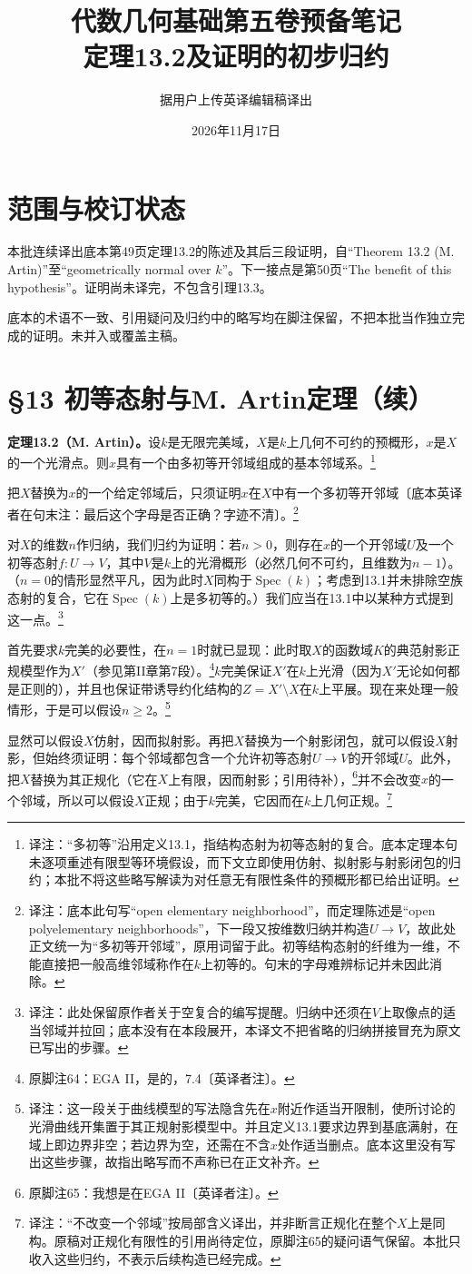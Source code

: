 \documentclass[openany,fontset=fandol]{ctexbook}
\newcommand{\note}[1]{\footnote{译注：#1}}
\begin{document}
\title{代数几何基础第五卷预备笔记\\定理13.2及证明的初步归约}
\author{据用户上传英译编辑稿译出}
\date{2026年11月17日}
\maketitle
\chapter*{范围与校订状态}
本批连续译出底本第49页定理13.2的陈述及其后三段证明，自“Theorem 13.2 (M. Artin)”至“geometrically normal over $k$”。下一接点是第50页“The benefit of this hypothesis”。证明尚未译完，不包含引理13.3。

底本的术语不一致、引用疑问及归约中的略写均在脚注保留，不把本批当作独立完成的证明。未并入或覆盖主稿。
\chapter*{§13 初等态射与M. Artin定理（续）}
\textbf{定理13.2（M. Artin）。}设$k$是无限完美域，$X$是$k$上几何不可约的预概形，$x$是$X$的一个光滑点。则$x$具有一个由多初等开邻域组成的基本邻域系。\note{“多初等”沿用定义13.1，指结构态射为初等态射的复合。底本定理本句未逐项重述有限型等环境假设，而下文立即使用仿射、拟射影与射影闭包的归约；本批不将这些略写解读为对任意无有限性条件的预概形都已给出证明。}

把$X$替换为$x$的一个给定邻域后，只须证明$x$在$X$中有一个多初等开邻域〔底本英译者在句末注：最后这个字母是否正确？字迹不清〕。\note{底本此句写“open elementary neighborhood”，而定理陈述是“open polyelementary neighborhoods”，下一段又按维数归纳并构造$U\to V$，故此处正文统一为“多初等开邻域”，原用词留于此。初等结构态射的纤维为一维，不能直接把一般高维邻域称作在$k$上初等的。句末的字母难辨标记并未因此消除。}

对$X$的维数$n$作归纳，我们归约为证明：若$n>0$，则存在$x$的一个开邻域$U$及一个初等态射$f\colon U\to V$，其中$V$是$k$上的光滑概形（必然几何不可约，且维数为$n-1$）。（$n=0$的情形显然平凡，因为此时$X$同构于$\operatorname{Spec}(k)$；考虑到13.1并未排除空族态射的复合，它在$\operatorname{Spec}(k)$上是多初等的。）我们应当在13.1中以某种方式提到这一点。\note{此处保留原作者关于空复合的编写提醒。归纳中还须在$V$上取像点的适当邻域并拉回；底本没有在本段展开，本译文不把省略的归纳拼接冒充为原文已写出的步骤。}

\newpage
首先要求$k$完美的必要性，在$n=1$时就已显现：此时取$X$的函数域$K$的典范射影正规模型作为$X'$（参见第II章第7段）。\footnote{原脚注64：EGA II，是的，7.4〔英译者注〕。}$k$完美保证$X'$在$k$上光滑（因为$X'$无论如何都是正则的），并且也保证带诱导约化结构的$Z=X'\setminus X$在$k$上平展。现在来处理一般情形，于是可以假设$n\geq2$。\note{这一段关于曲线模型的写法隐含先在$x$附近作适当开限制，使所讨论的光滑曲线开集置于其正规射影模型中。并且定义13.1要求边界到基底满射，在域上即边界非空；若边界为空，还需在不含$x$处作适当删点。底本这里没有写出这些步骤，故指出略写而不声称已在正文补齐。}

显然可以假设$X$仿射，因而拟射影。再把$X$替换为一个射影闭包，就可以假设$X$射影，但始终须证明：每个邻域都包含一个允许初等态射$U\to V$的开邻域$U$。此外，把$X$替换为其正规化（它在$X$上有限，因而射影；引用待补），\footnote{原脚注65：我想是在EGA II〔英译者注〕。}并不会改变$x$的一个邻域，所以可以假设$X$正规；由于$k$完美，它因而在$k$上几何正规。\note{“不改变一个邻域”按局部含义译出，并非断言正规化在整个$X$上是同构。原稿对正规化有限性的引用尚待定位，原脚注65的疑问语气保留。本批只收入这些归约，不表示后续构造已经完成。}
\end{document}
